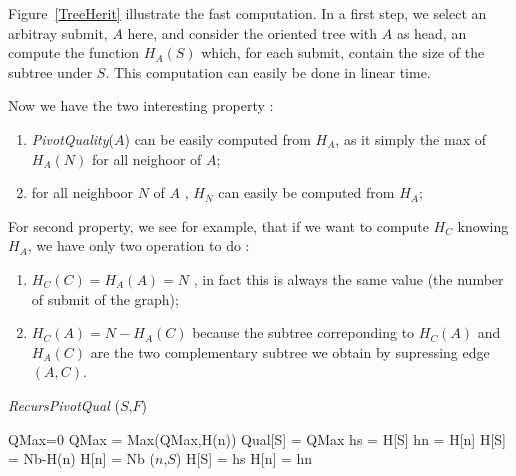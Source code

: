 \documentclass[a4paper]{article}
\begin{document}
Figure~\ref{TreeHerit} illustrate the fast computation. In a first step, we select
an arbitray submit, $A$ here, and consider the oriented tree with $A$ as head, an compute
the function $H_A(S)$ which, for each submit, contain the size of the subtree under $S$. This computation
can easily be done in linear time.

Now we have the two interesting property : 

\begin{enumerate}
  \item   \emph{PivotQuality}($A$) can be easily computed from  $H_A$, as it
          simply the max of  $H_A(N)$ for all neighoor of $A$;
  \item   for all neighboor $N$ of $A$ , $H_N$ can easily be computed from $H_A$;
\end{enumerate}

For second property, we see for example, that if we want to compute $H_C$ knowing
$H_A$, we have only two operation to do :


\begin{enumerate}
  \item   $H_C(C) = H_A(A) = N$ , in  fact this is always the same value (the number of submit of the graph);
  \item   $H_C(A) = N-H_A(C)$  because the subtree correponding to $H_C(A)$ and $H_A(C)$ are the
          two complementary subtree we obtain by supressing edge $(A,C)$.
\end{enumerate}


\begin{algorithm}
\caption{{\it RecursPivotQual} ($S$,$F$)  }
\begin{algorithmic}
     \STATE {}
     \STATE QMax=0  
              \STATE QMax = Max(QMax,H(n))
     \ENDFOR
     \STATE Qual[S] = QMax
     \STATE {}
              \STATE {}
              \STATE hs = H[S]
              \STATE hn = H[n]
              \STATE H[S] = Nb-H(n)
              \STATE H[n] = Nb
              ($n$,$S$)
              \STATE {}
              \STATE H[S] = hs
              \STATE H[n] = hn
     \ENDFOR
\end{algorithmic}
\label{AlgoComp}
\end{algorithm}
\end{document}
